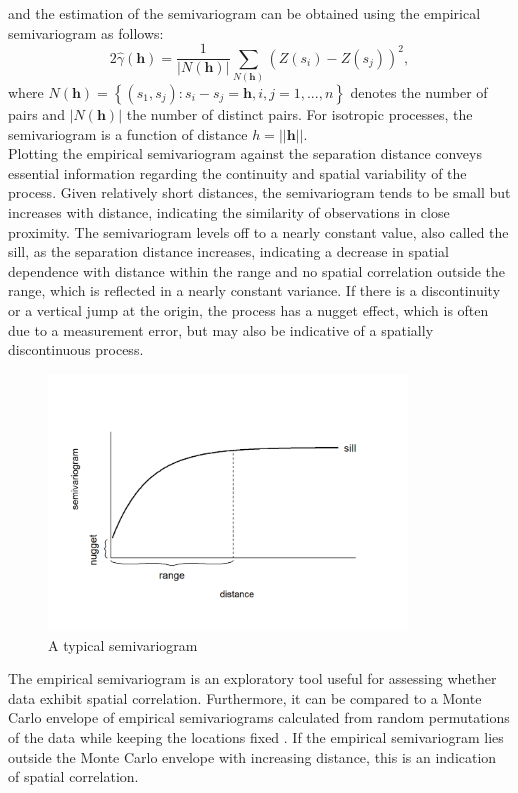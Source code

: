 and the estimation of the semivariogram can be obtained using the empirical semivariogram as follows:
\begin{equation}
    2\widehat{\gamma}\left(\pmb{h}\right)=\frac{1}{\left|N\left(\pmb{h}\right)\right|}\sum_{N\left(\pmb{h}\right)}\left(Z\left(s_i\right)-Z\left(s_j\right)\right)^2,
\end{equation}
where $N\left(\pmb{h}\right)=\left\lbrace\left(s_1,s_j\right):s_i-s_j=\pmb{h}, i,j=1,...,n\right\rbrace$ denotes the number of pairs and $\left|N\left(\pmb{h}\right)\right|$ the number of distinct pairs. For isotropic processes, the semivariogram is a function of distance $h=\left|\left|\pmb{h}\right|\right|$.   \\
Plotting the empirical semivariogram against the separation distance conveys essential information regarding the continuity and spatial variability of the process. Given relatively short distances, the semivariogram tends to be small but increases with distance, indicating the similarity of observations in close proximity. The semivariogram levels off to a nearly constant value, also called the sill, as the separation distance increases, indicating a decrease in spatial dependence with distance within the range and no spatial correlation outside the range, which is reflected in a nearly constant variance. If there is a discontinuity or a vertical jump at the origin, the process has a nugget effect, which is often due to a measurement error, but may also be indicative of a spatially discontinuous process.
\begin{figure}
    \centering
    \includegraphics[width=0.85\textwidth]{typicalsemivariogram-1.png}
    \caption{A typical semivariogram}
    \label{fig:my_label}
\end{figure}
The empirical semivariogram is an exploratory tool useful for assessing whether data exhibit spatial correlation. Furthermore, it can be compared to a Monte Carlo envelope of empirical semivariograms calculated from random permutations of the data while keeping the locations fixed \autocite[][]{diggle2003introduction}. If the empirical semivariogram lies outside the Monte Carlo envelope with increasing distance, this is an indication of spatial correlation.\\
